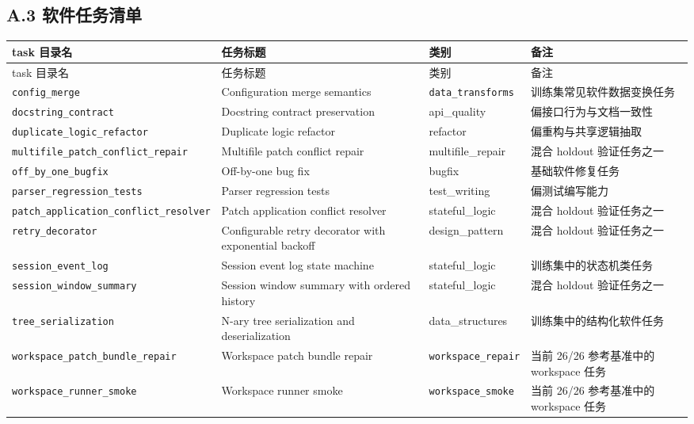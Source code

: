 \documentclass[11pt,a4paper]{article}
\newcommand{\code}[1]{\begingroup\ttfamily\footnotesize\nolinkurl{#1}\endgroup}
\begin{document}
\subsection{A.3 软件任务清单}

\scriptsize
\begin{longtable}{T{3.0cm} p{4.0cm} T{3.0cm} p{3.8cm}}
\toprule
task 目录名 & 任务标题 & 类别 & 备注 \\
\midrule
\endfirsthead
\toprule
task 目录名 & 任务标题 & 类别 & 备注 \\
\midrule
\endhead
\code{config_merge} & Configuration merge semantics & \code{data\_transforms} & 训练集常见软件数据变换任务 \\
\code{docstring_contract} & Docstring contract preservation & api\_quality & 偏接口行为与文档一致性 \\
\code{duplicate_logic_refactor} & Duplicate logic refactor & refactor & 偏重构与共享逻辑抽取 \\
\code{multifile_patch_conflict_repair} & Multifile patch conflict repair & multifile\_repair & 混合 holdout 验证任务之一 \\
\code{off_by_one_bugfix} & Off-by-one bug fix & bugfix & 基础软件修复任务 \\
\code{parser_regression_tests} & Parser regression tests & test\_writing & 偏测试编写能力 \\
\code{patch_application_conflict_resolver} & Patch application conflict resolver & stateful\_logic & 混合 holdout 验证任务之一 \\
\code{retry_decorator} & Configurable retry decorator with exponential backoff & design\_pattern & 混合 holdout 验证任务之一 \\
\code{session_event_log} & Session event log state machine & stateful\_logic & 训练集中的状态机类任务 \\
\code{session_window_summary} & Session window summary with ordered history & stateful\_logic & 混合 holdout 验证任务之一 \\
\code{tree_serialization} & N-ary tree serialization and deserialization & data\_structures & 训练集中的结构化软件任务 \\
\code{workspace_patch_bundle_repair} & Workspace patch bundle repair & \code{workspace\_}\newline \code{repair} & 当前 26/26 参考基准中的 workspace 任务 \\
\code{workspace_runner_smoke} & Workspace runner smoke & \code{workspace\_}\newline \code{smoke} & 当前 26/26 参考基准中的 workspace 任务 \\
\bottomrule
\end{longtable}
\normalsize
\end{document}
